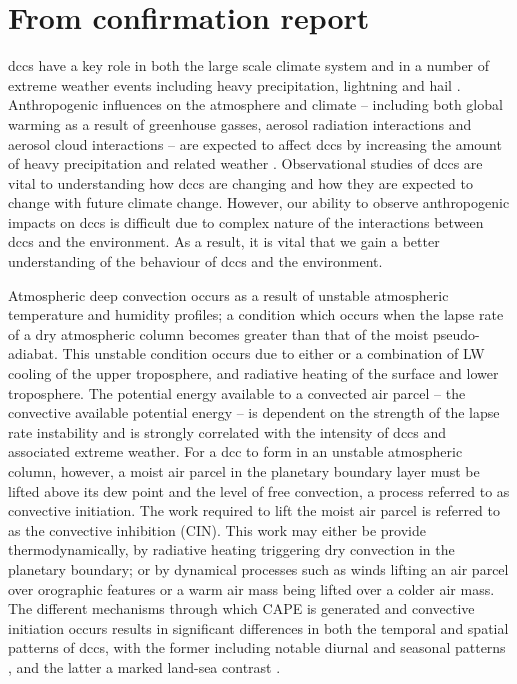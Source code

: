 \section{From confirmation report}
\acrshort{dcc}s have a key role in both the large scale climate system and in a number of extreme weather events including heavy precipitation, lightning and hail \citep[e.g.][]{westra_future_2014, houze_chapter_2014, williams_radar_1992, bruning_theory_2013, punge_hail_2016, matsudo_severe_2011}.
Anthropogenic influences on the atmosphere and climate -- including both global warming as a result of greenhouse gasses, aerosol radiation interactions and aerosol cloud interactions -- are expected to affect \acrshort{dcc}s by increasing the amount of heavy precipitation and related weather \citep[e.g.][]{allen_constraints_2002, trenberth_changing_2003, held_robust_2006, khain2005aerosol, koren_smoke_2008, rosenfeld_flood_2008, fan_microphysical_2013, fan_review_2016}.
Observational studies of \acrshort{dcc}s are vital to understanding how \acrshort{dcc}s are changing and how they are expected to change with future climate change.
However, our ability to observe anthropogenic impacts on \acrshort{dcc}s is difficult due to complex nature of the interactions between \acrshort{dcc}s and the environment.
As a result, it is vital that we gain a better understanding of the behaviour of \acrshort{dcc}s and the environment.

Atmospheric deep convection occurs as a result of unstable atmospheric temperature and humidity profiles; a condition which occurs when the lapse rate of a dry atmospheric column becomes greater than that of the moist pseudo-adiabat.
This unstable condition occurs due to either or a combination of LW cooling of the upper troposphere, and radiative heating of the surface and lower troposphere.
The potential energy available to a convected air parcel -- the convective available potential energy -- is dependent on the strength of the lapse rate instability and is strongly correlated with the intensity of \acrshort{dcc}s and associated extreme weather.
For a \acrshort{dcc} to form in an unstable atmospheric column, however, a moist air parcel in the planetary boundary layer must be lifted above its dew point and the level of free convection, a process referred to as convective initiation.
The work required to lift the moist air parcel is referred to as the convective inhibition (CIN).
This work may either be provide thermodynamically, by radiative heating triggering dry convection in the planetary boundary; or by dynamical processes such as winds lifting an air parcel over orographic features or a warm air mass being lifted over a colder air mass.
The different mechanisms through which CAPE is generated and convective initiation occurs results in significant differences in both the temporal and spatial patterns of \acrshort{dcc}s, with the former including notable diurnal and seasonal patterns \citep{chen_diurnal_1997}, and the latter a marked land-sea contrast \citep{taylor_evaluating_2017}.


